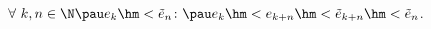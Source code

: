 
$\forall\  k,n\in\N\pau e_k\hm<\tilde e_n\colon \pau e_k\hm<e_{k+n}\hm<\tilde e_{k+n}\hm<\tilde e_n$.
